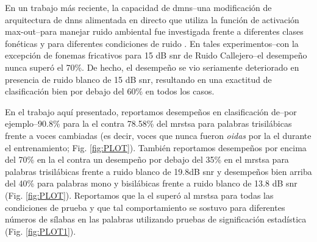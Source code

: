 {En un trabajo más reciente, la capacidad de \glspl{dmn}--una modificación de arquitectura de \glspl{dnn} alimentada en directo que utiliza la función de activación max-out--para manejar ruido ambiental fue investigada frente a diferentes clases fonéticas y para diferentes condiciones de ruido \cite{silos_2016}. En tales experimentos--con la excepción de fonemas fricativos para 15 dB \gls{snr} de Ruido Callejero--el desempeño nunca superó el 70\%. De hecho, el desempeño se vio seriamente deteriorado en presencia de ruido blanco de 15 dB \gls{snr}, resultando en una exactitud de clasificación bien por debajo del 60\% en todos los casos.

En el trabajo aquí presentado, reportamos desempeños en clasificación de--por ejemplo--90.8\% para la \gls{el} contra 78.58\% del \gls{mrstsa} para palabras trisilábicas frente a voces cambiadas (es decir, voces que nunca fueron \emph{oidas} por la \gls{el} durante el entrenamiento; Fig. \ref{fig:PLOT}). También reportamos desempeños por encima del 70\% en la \gls{el} contra un desempeño por debajo del 35\% en el \gls{mrstsa} para palabras trisilábicas frente a ruido blanco de 19.8dB \gls{snr} y desempeños bien arriba del 40\% para palabras mono y bisilábicas frente a ruido blanco de 13.8 dB \gls{snr} (Fig. \ref{fig:PLOT}). Reportamos que la \gls{el} superó al \gls{mrstsa} para todas las condiciones de prueba y que tal comportamiento se sostuvo para diferentes números de sílabas en las palabras utilizando pruebas de significación estadística (Fig. \ref{fig:PLOT1}).

}
